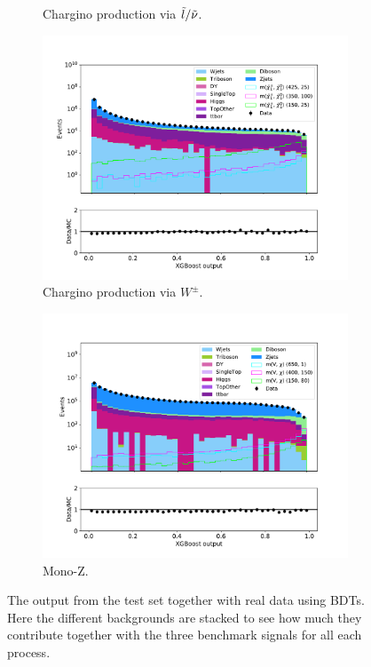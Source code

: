 \begin{figure}[H]
\begin{subfigure}[t!]{0.49\textwidth}
        \caption{Chargino production via $\Tilde{l}/\Tilde{\nu}$.}
        \label{fig:BDTdataAllSlepsnu}
    \end{subfigure}      
    \begin{subfigure}[t!]{0.49\textwidth}
        \includegraphics[width = \textwidth]{Figures/Stacked/stackedplot_BDT_All_level_WW.pdf}
        \caption{Chargino production via $W^\pm$.}
        \label{fig:BDTdataAllWW}
    \end{subfigure}
    \begin{subfigure}[t!]{0.49\textwidth}
        \includegraphics[width = \textwidth]{Figures/Stacked/stackedplot_BDT_All_level_monoZ.pdf}
        \caption{Mono-Z.}
        \label{fig:BDTdataAllmonoZ}
    \end{subfigure}
    \caption{The output from the test set together with real data using BDTs. Here the different backgrounds are stacked to see how much they contribute together with the three benchmark signals for all each process.}
    \label{fig:BDTdataAll}
\end{figure}


